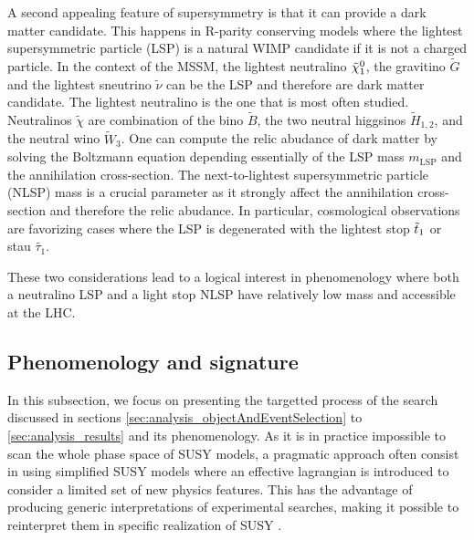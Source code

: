         A second appealing feature of supersymmetry is that it can provide a dark matter 
        candidate. This happens in R-parity conserving models where the lightest supersymmetric
        particle (LSP) is a natural WIMP candidate if it is not a charged particle. In the
        context of the MSSM, the lightest neutralino $\tilde{\chi}_1^0$, the gravitino $\tilde{G}$
        and the lightest sneutrino $\tilde{\nu}$ can be the LSP and therefore are dark matter
        candidate. The lightest neutralino is the one that is most often studied. Neutralinos
        $\tilde{\chi}$ are combination of the bino $\tilde{B}$, the two neutral higgsinos 
        $\tilde{H}_{1,2}$, and the neutral wino $\tilde{W}_3$. One can compute the relic
        abudance of dark matter by solving the Boltzmann equation \cite{EllisDarkMatter}
        depending essentially of the LSP mass $m_{\text{LSP}}$ and the annihilation cross-section.
        The next-to-lightest supersymmetric particle (NLSP) mass is a crucial parameter as 
        it strongly affect the annihilation cross-section and therefore the relic abudance. 
        In particular, cosmological observations are favorizing cases where the LSP is 
        degenerated with the lightest stop $\tilde{t}_1$ or stau $\tilde{\tau_1}$.
        
        These two considerations lead to a logical interest in phenomenology where both a 
        neutralino LSP and a light stop NLSP have relatively low mass and accessible at the LHC.

        \subsection{Phenomenology and signature}

        In this subsection, we focus on presenting the targetted process of the search discussed 
        in sections \ref{sec:analysis_objectAndEventSelection} to \ref{sec:analysis_results} and 
        its phenomenology. As it is in practice impossible to scan the whole phase space of SUSY
        models, a pragmatic approach often consist in using simplified SUSY models where an 
        effective lagrangian is introduced to consider a limited set of new physics features. 
        This has the advantage of producing generic interpretations of experimental searches, 
        making it possible to reinterpret them in specific realization of SUSY \cite{SusySimplifiedModels, SmodelS}.

